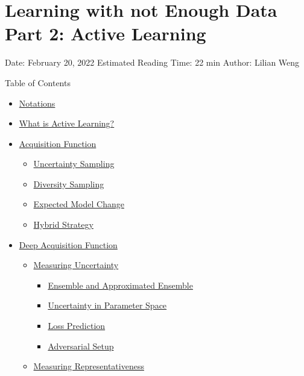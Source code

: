 \section{Learning with not Enough Data Part 2: Active Learning}\label{learning-with-not-enough-data-part-2-active-learning}

Date: February 20, 2022 \textbar{} Estimated Reading Time: 22 min \textbar{} Author: Lilian Weng

{Table of Contents}

\begin{itemize}
\tightlist
\item
  \hyperref[notations]{Notations}
\item
  \hyperref[what-is-active-learning]{What is Active Learning?}
\item
  \hyperref[acquisition-function]{Acquisition Function}

  \begin{itemize}
  \tightlist
  \item
    \hyperref[uncertainty-sampling]{Uncertainty Sampling}
  \item
    \hyperref[diversity-sampling]{Diversity Sampling}
  \item
    \hyperref[expected-model-change]{Expected Model Change}
  \item
    \hyperref[hybrid-strategy]{Hybrid Strategy}
  \end{itemize}
\item
  \hyperref[deep-acquisition-function]{Deep Acquisition Function}

  \begin{itemize}
  \tightlist
  \item
    \hyperref[measuring-uncertainty]{Measuring Uncertainty}

    \begin{itemize}
    \tightlist
    \item
      \hyperref[ensemble-and-approximated-ensemble]{Ensemble and Approximated Ensemble}
    \item
      \hyperref[uncertainty-in-parameter-space]{Uncertainty in Parameter Space}
    \item
      \hyperref[loss-prediction]{Loss Prediction}
    \item
      \hyperref[adversarial-setup]{Adversarial Setup}
    \end{itemize}
  \item
    \hyperref[measuring-representativeness]{Measuring Representativeness}


\end{itemize}
\end{itemize}
